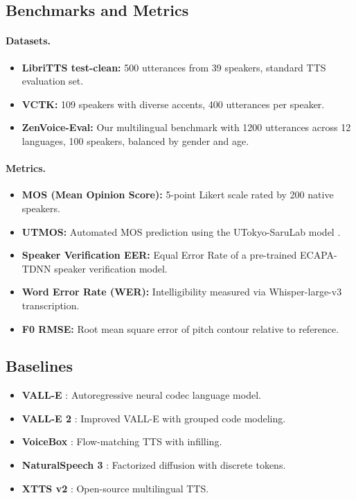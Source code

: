 \documentclass[11pt,a4paper]{article}
\begin{document}
\subsection{Benchmarks and Metrics}

\paragraph{Datasets.}
\begin{itemize}
    \item \textbf{LibriTTS test-clean:} 500 utterances from 39 speakers, standard TTS evaluation set.
    \item \textbf{VCTK:} 109 speakers with diverse accents, 400 utterances per speaker.
    \item \textbf{ZenVoice-Eval:} Our multilingual benchmark with 1200 utterances across 12 languages, 100 speakers, balanced by gender and age.
\end{itemize}

\paragraph{Metrics.}
\begin{itemize}
    \item \textbf{MOS (Mean Opinion Score):} 5-point Likert scale rated by 200 native speakers.
    \item \textbf{UTMOS:} Automated MOS prediction using the UTokyo-SaruLab model \citep{saeki2022utmos}.
    \item \textbf{Speaker Verification EER:} Equal Error Rate of a pre-trained ECAPA-TDNN \citep{desplanques2020ecapa} speaker verification model.
    \item \textbf{Word Error Rate (WER):} Intelligibility measured via Whisper-large-v3 transcription.
    \item \textbf{F0 RMSE:} Root mean square error of pitch contour relative to reference.
\end{itemize}

\subsection{Baselines}

\begin{itemize}
    \item \textbf{VALL-E} \citep{wang2023neural}: Autoregressive neural codec language model.
    \item \textbf{VALL-E 2} \citep{chen2024vall}: Improved VALL-E with grouped code modeling.
    \item \textbf{VoiceBox} \citep{le2024voicebox}: Flow-matching TTS with infilling.
    \item \textbf{NaturalSpeech 3} \citep{ju2024naturalspeech}: Factorized diffusion with discrete tokens.
    \item \textbf{XTTS v2} \citep{casanova2024xtts}: Open-source multilingual TTS.
\end{itemize}
\end{document}
